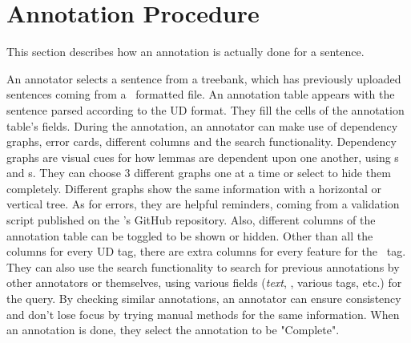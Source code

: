 \section{Annotation Procedure}
\label{sec:annotation}
This section describes how an annotation is actually done for a sentence.

An annotator selects a sentence from a treebank, which has previously uploaded sentences coming from a \conllu\ formatted file.
An annotation table appears with the sentence parsed according to the UD format.
They fill the cells of the annotation table's fields.
During the annotation, an annotator can make use of dependency graphs, error cards, different columns and the search functionality.
Dependency graphs are visual cues for how lemmas are dependent upon one another, using \head s and \deprel s.
They can choose 3 different graphs one at a time or select to hide them completely.
Different graphs show the same information with a horizontal or vertical tree.
As for errors, they are helpful reminders, coming from a validation script published on the \ud's GitHub repository.
Also, different columns of the annotation table can be toggled to be shown or hidden.
Other than all the columns for every UD tag, there are extra columns for every feature for the \feats\ tag.
They can also use the search functionality to search for previous annotations by other annotators or themselves, using various fields (\textit{text}, \feats, various tags, etc.) for the query.
By checking similar annotations, an annotator can ensure consistency and don't lose focus by trying manual methods for the same information.
When an annotation is done, they select the annotation to be "Complete".
